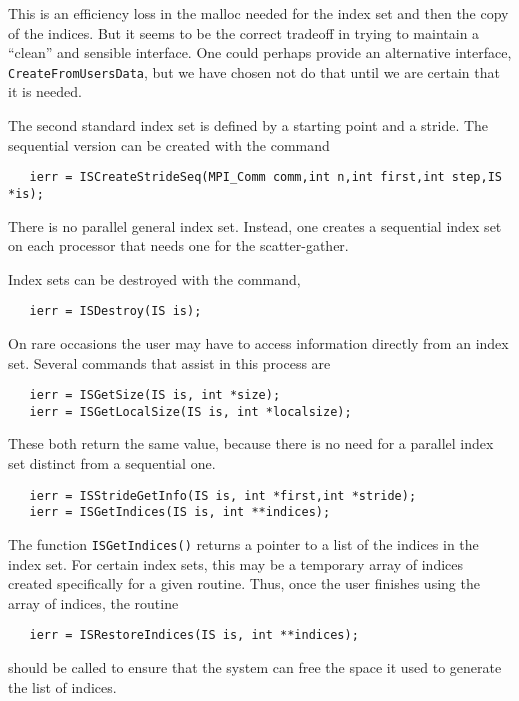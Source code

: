 \begin{design}
This is an efficiency loss in the malloc needed for the 
index set and then the copy of the indices. But it seems to be the 
correct tradeoff in trying to maintain a ``clean'' and sensible interface.
One could perhaps provide an alternative interface, {\tt CreateFromUsersData},
but we have chosen not do that until we are certain that it is needed.
\end{design}

The second standard index set is defined by a starting point and a
stride. 
The sequential  version can be created
with the command
\begin{verbatim}
   ierr = ISCreateStrideSeq(MPI_Comm comm,int n,int first,int step,IS *is);
\end{verbatim}

There is no parallel general index set. Instead, one creates a sequential
index set on each processor that needs one for the scatter-gather.

Index sets can be destroyed with the command, 
\begin{verbatim}
   ierr = ISDestroy(IS is); 
\end{verbatim}

On rare occasions the user may have to access information directly 
from an index set.  
Several commands that  
assist in this process are
\begin{verbatim}
   ierr = ISGetSize(IS is, int *size);
   ierr = ISGetLocalSize(IS is, int *localsize);
\end{verbatim}
These both return the same value, because there is no need for a 
parallel index set distinct from a sequential one.
\begin{verbatim}
   ierr = ISStrideGetInfo(IS is, int *first,int *stride);
   ierr = ISGetIndices(IS is, int **indices);
\end{verbatim}
The function {\tt ISGetIndices()} returns a pointer to a list of the 
indices in the index set. 
For certain index sets, this may be a 
temporary array of indices created specifically for a given routine. 
Thus, once the user finishes using the array of indices, 
the routine 
\begin{verbatim}
   ierr = ISRestoreIndices(IS is, int **indices); 
\end{verbatim}
should be called to ensure that the system can free the space it 
used to generate the list of indices.

